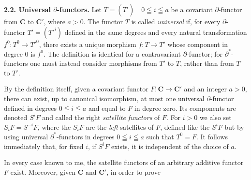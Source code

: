 \indent\textbf{2.2. Universal $\partial$-functors.}
Let $T=(T^i)\quad 0\leqq i\leqq a$ be a covariant $\partial$-functor from $\mathbf{C}$ to
$\mathbf{C}'$, where $a>0$. The functor $T$ is called \textit{universal} if, for every
$\partial$-functor $T'=(T'^i)$ defined in the same degrees and every natural
transformation $f^0:T^0\to T'^0$, there exists a
unique morphism $f:T\to T'$ whose component in degree $0$ is
$f^0$. The definition is identical for a contravariant
$\partial$-functor; for $\partial^*$-functors one must instead consider
morphisms from $T'$ to $T$, rather than from $T$ to $T'$.

By the definition itself, given a covariant functor $F:\mathbf{C}\to \mathbf{C}'$
and an integer $a>0$, there can exist, up to canonical isomorphism, at most
one universal $\partial$-functor defined in degrees $0\leqq i\leqq a$ and equal
to $F$ in degree zero.
Its components are denoted $S^iF$ and called the right \textit{satellite
functors} of $F$. For $i>0$ we also set $S_iF=S^{-i}F$, where the $S_iF$ are
the \textit{left} satellites of $F$, defined like the $S^iF$ but by using
universal $\partial^*$-functors in degrees $0\leqq i\leqq a$ such that $T^0=F$.
It follows immediately that, for fixed $i$, if $S^iF$ exists, it is
independent of the choice of $a$.

In every case known to me, the satellite functors of an arbitrary additive
functor $F$ exist. Moreover, given $\mathbf{C}$ and $\mathbf{C}'$, in order to prove

